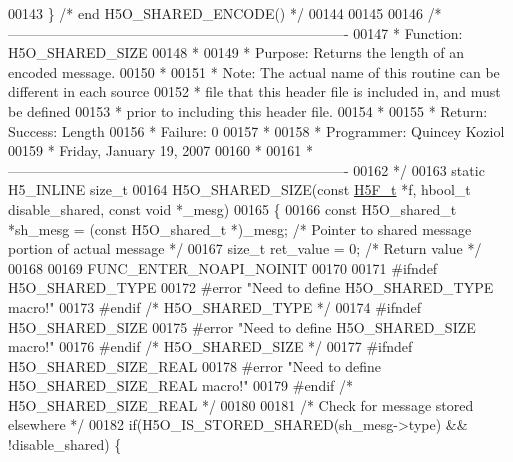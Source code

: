 \begin{DoxyCode}
00143 \} \textcolor{comment}{/* end H5O\_SHARED\_ENCODE() */}
00144 
00145 
00146 \textcolor{comment}{/*-------------------------------------------------------------------------}
00147 \textcolor{comment}{ * Function:    H5O\_SHARED\_SIZE}
00148 \textcolor{comment}{ *}
00149 \textcolor{comment}{ * Purpose: Returns the length of an encoded message.}
00150 \textcolor{comment}{ *}
00151 \textcolor{comment}{ * Note:    The actual name of this routine can be different in each source}
00152 \textcolor{comment}{ *      file that this header file is included in, and must be defined}
00153 \textcolor{comment}{ *      prior to including this header file.}
00154 \textcolor{comment}{ *}
00155 \textcolor{comment}{ * Return:  Success:    Length}
00156 \textcolor{comment}{ *      Failure:    0}
00157 \textcolor{comment}{ *}
00158 \textcolor{comment}{ * Programmer:  Quincey Koziol}
00159 \textcolor{comment}{ *              Friday, January 19, 2007}
00160 \textcolor{comment}{ *}
00161 \textcolor{comment}{ *-------------------------------------------------------------------------}
00162 \textcolor{comment}{ */}
00163 \textcolor{keyword}{static} H5\_INLINE \textcolor{keywordtype}{size\_t}
00164 H5O\_SHARED\_SIZE(\textcolor{keyword}{const} \hyperlink{struct_h5_f__t}{H5F\_t} *f, hbool\_t disable\_shared, \textcolor{keyword}{const} \textcolor{keywordtype}{void} *\_mesg)
00165 \{
00166     \textcolor{keyword}{const} H5O\_shared\_t *sh\_mesg = (\textcolor{keyword}{const} H5O\_shared\_t *)\_mesg;     \textcolor{comment}{/* Pointer to shared message portion of
       actual message */}
00167     \textcolor{keywordtype}{size\_t} ret\_value = 0;       \textcolor{comment}{/* Return value */}
00168 
00169     FUNC\_ENTER\_NOAPI\_NOINIT
00170 
00171 \textcolor{preprocessor}{#ifndef H5O\_SHARED\_TYPE}
00172 \textcolor{preprocessor}{#error "Need to define H5O\_SHARED\_TYPE macro!"}
00173 \textcolor{preprocessor}{#endif }\textcolor{comment}{/* H5O\_SHARED\_TYPE */}\textcolor{preprocessor}{}
00174 \textcolor{preprocessor}{#ifndef H5O\_SHARED\_SIZE}
00175 \textcolor{preprocessor}{#error "Need to define H5O\_SHARED\_SIZE macro!"}
00176 \textcolor{preprocessor}{#endif }\textcolor{comment}{/* H5O\_SHARED\_SIZE */}\textcolor{preprocessor}{}
00177 \textcolor{preprocessor}{#ifndef H5O\_SHARED\_SIZE\_REAL}
00178 \textcolor{preprocessor}{#error "Need to define H5O\_SHARED\_SIZE\_REAL macro!"}
00179 \textcolor{preprocessor}{#endif }\textcolor{comment}{/* H5O\_SHARED\_SIZE\_REAL */}\textcolor{preprocessor}{}
00180 
00181     \textcolor{comment}{/* Check for message stored elsewhere */}
00182     \textcolor{keywordflow}{if}(H5O\_IS\_STORED\_SHARED(sh\_mesg->type) && !disable\_shared) \{

\end{DoxyCode}
